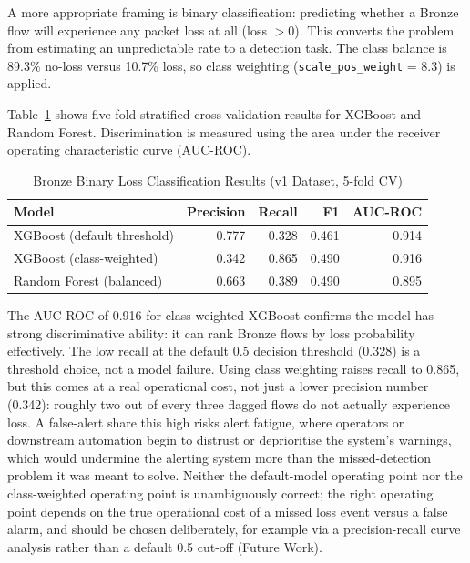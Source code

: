 \documentclass[a4paper,12pt]{Classes/RoboticsLaTeX}
\begin{document}
A more appropriate framing is binary classification: predicting whether a Bronze flow will experience any packet loss at all (loss $> 0$). This converts the problem from estimating an unpredictable rate to a detection task. The class balance is 89.3\% no-loss versus 10.7\% loss, so class weighting (\texttt{scale\_pos\_weight} = 8.3) is applied.

Table~\ref{tab:bronze_loss_clf} shows five-fold stratified cross-validation results for XGBoost and Random Forest. Discrimination is measured using the area under the receiver operating characteristic curve (AUC-ROC).

\begin{table}[H]
\centering
\caption[Bronze Binary Loss Classification Results]{Bronze Binary Loss Classification Results (v1 Dataset, 5-fold CV)}
\label{tab:bronze_loss_clf}
\begin{tabular}{|l|r|r|r|r|}
\hline
\textbf{Model} & \textbf{Precision} & \textbf{Recall} & \textbf{F1} & \textbf{AUC-ROC} \\
\hline
XGBoost (default threshold) & 0.777 & 0.328 & 0.461 & 0.914 \\
\hline
XGBoost (class-weighted)    & 0.342 & 0.865 & 0.490 & 0.916 \\
\hline
Random Forest (balanced)    & 0.663 & 0.389 & 0.490 & 0.895 \\
\hline
\end{tabular}
\end{table}

The AUC-ROC of 0.916 for class-weighted XGBoost confirms the model has strong discriminative ability: it can rank Bronze flows by loss probability effectively. The low recall at the default 0.5 decision threshold (0.328) is a threshold choice, not a model failure. Using class weighting raises recall to 0.865, but this comes at a real operational cost, not just a lower precision number (0.342): roughly two out of every three flagged flows do not actually experience loss. A false-alert share this high risks alert fatigue, where operators or downstream automation begin to distrust or deprioritise the system's warnings, which would undermine the alerting system more than the missed-detection problem it was meant to solve. Neither the default-model operating point nor the class-weighted operating point is unambiguously correct; the right operating point depends on the true operational cost of a missed loss event versus a false alarm, and should be chosen deliberately, for example via a precision-recall curve analysis rather than a default 0.5 cut-off (Future Work).
\end{document}
